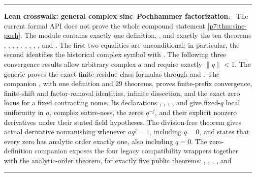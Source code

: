 \documentclass[11pt,oneside]{article}
\numberwithin{equation}{section}
\theoremstyle{definition}
\theoremstyle{remark}
\newenvironment{statusbox}[1]{%
  \par\medskip\noindent\begin{center}\begin{minipage}{0.94\textwidth}%
  \color{linkblue}\hrule\vspace{0.65em}%
  \color{black}\textbf{\color{linkblue}#1.}\ }{%
  \par\vspace{0.65em}\color{linkblue}\hrule
  \end{minipage}\end{center}\medskip}
\begin{document}
\begin{statusbox}{Lean crosswalk: general complex sinc--Pochhammer factorization}
The current formal API does not prove the whole compound statement
\cref{p7:thm:sinc-poch}.  The module
 contains exactly one definition,
, and exactly the ten theorems
,
,
,
,
,
,
,
,
, and
.  The first two
equalities are unconditional; in particular, the second identifies the
historical complex symbol with .  The following three
convergence results allow arbitrary complex $a$ and require exactly
$\lVert q\rVert<1$.
The generic  proves the exact finite
residue-class formulas through
 and
.  The companion
, with one definition
 and 29 theorems, proves finite-prefix convergence,
finite-shift and factor-removal identities, infinite dissection, and the exact
zero locus for a fixed contracting nome.
Its declarations ,
,
,
, and
 give fixed-$q$ local uniformity
in $a$, complex entire-ness, the zeros $q^{-j}$, and their explicit nonzero
derivatives under their stated field hypotheses.
The division-free theorem
 gives actual derivative
nonvanishing whenever $aq^j=1$, including $q=0$, and
 states that every zero has
analytic order exactly one, also including $q=0$.
The zero-definition companion  exposes the four
legacy compatibility wrappers together with the analytic-order theorem, for
exactly five public theorems:
,
,
,
, and

\end{statusbox}
\end{document}
